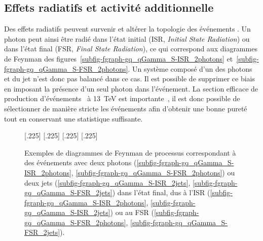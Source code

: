 \subsection{Effets radiatifs et activité additionnelle}\label{chapter-JERC-section-pheno-GJets-subsec-effets_radiatifs}
Des effets radiatifs peuvent survenir et altérer la topologie des événements \Gjets.
Un photon peut ainsi être radié dans l'état initial (ISR, \emph{Initial State Radiation}) ou dans l'état final (FSR, \emph{Final State Radiation}), ce qui correspond aux diagrammes de Feynman des figures~\ref{subfig-fgraph-gq_qGamma_S-ISR_2photons} et~\ref{subfig-fgraph-gq_qGamma_S-FSR_2photons}.
Un système composé d'un des photons et du jet n'est donc pas balancé dans ce cas.
Il est possible de supprimer ce biais en imposant la présence d'un seul photon dans l'événement.
La section efficace de production d'événements \Gjets\ à \SI{13}{\TeV} est importante~\cite{Gjet_xsec_2018}, il est donc possible de sélectionner de manière stricte les événements afin d'obtenir une bonne pureté tout en conservant une statistique suffisante.
\begin{figure}[h]
\centering\vspace{\baselineskip}
\subcaptionbox{\label{subfig-fgraph-gq_qGamma_S-ISR_2photons}}[.225\textwidth]
{\vspace{\baselineskip}}
\hfill
\subcaptionbox{\label{subfig-fgraph-gq_qGamma_S-FSR_2photons}}[.225\textwidth]
{\vspace{\baselineskip}}
\hfill
\subcaptionbox{\label{subfig-fgraph-gq_qGamma_S-ISR_2jets}}[.225\textwidth]
{\vspace{\baselineskip}}
\hfill
\subcaptionbox{\label{subfig-fgraph-gq_qGamma_S-FSR_2jets}}[.225\textwidth]
{\vspace{\baselineskip}}
\caption[Diagrammes de Feynman de processus avec ISR ou FSR.]{Exemples de diagrammes de Feynman de processus correspondant à des événements avec deux photons (\ref{subfig-fgraph-gq_qGamma_S-ISR_2photons}, \ref{subfig-fgraph-gq_qGamma_S-FSR_2photons}) ou deux jets (\ref{subfig-fgraph-gq_qGamma_S-ISR_2jets}, \ref{subfig-fgraph-gq_qGamma_S-FSR_2jets}) dans l'état final, dus à l'ISR (\ref{subfig-fgraph-gq_qGamma_S-ISR_2photons}, \ref{subfig-fgraph-gq_qGamma_S-ISR_2jets}) ou au FSR (\ref{subfig-fgraph-gq_qGamma_S-FSR_2photons}, \ref{subfig-fgraph-gq_qGamma_S-FSR_2jets}).}
\label{fig-fgraph-gamma_plus_jets-ISR-FSR}
\end{figure}
